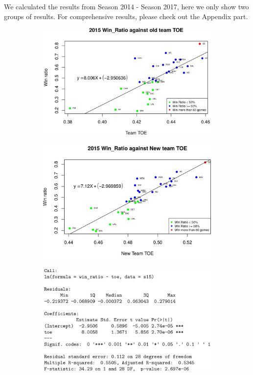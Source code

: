 \documentclass[11pt]{article}
\begin{document}
We calculated the results from Season 2014 - Season 2017, here we only show two groups of results. For comprehensive results, please check out the Appendix part.
\begin{figure}[h!]
  \centering
  \begin{subfigure}[b]{0.45\linewidth}
    \includegraphics[width=\linewidth]{15old.jpg}
  \end{subfigure}
  \begin{subfigure}[b]{0.45\linewidth}
    \includegraphics[width=\linewidth]{15new.jpg}
  \end{subfigure}
  \begin{subfigure}[b]{0.42\linewidth}
    \includegraphics[width=\linewidth]{15oldsummary.jpg}

\end{subfigure}
\end{figure}
\end{document}
